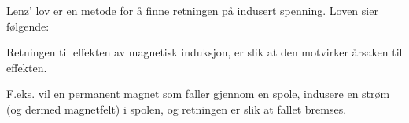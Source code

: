 Lenz' lov er en metode for å finne retningen på indusert spenning.
Loven sier følgende:

Retningen til effekten av magnetisk induksjon,
er slik at den motvirker årsaken til effekten.

F.eks. vil en permanent magnet som faller gjennom en spole,
indusere en strøm (og dermed magnetfelt) i spolen,
og retningen er slik at fallet bremses.
